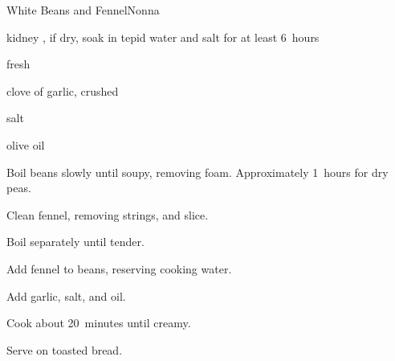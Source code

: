\begin{recipe}{White Beans and Fennel}{Nonna}{}

\begin{ingredients}
\item kidney , if dry, soak in tepid water and salt for at least 6~hours
\item fresh 
\item clove of garlic, crushed
\item salt
\item olive oil
\end{ingredients}

\begin{directions}
\item Boil beans slowly until soupy, removing foam. Approximately 1\half~hours for dry peas.
\item Clean fennel, removing strings, and slice.
\item Boil separately until tender.
\item Add fennel to beans, reserving cooking water.
\item Add garlic, salt, and oil.
\item Cook about 20~minutes until creamy.
\item Serve on toasted bread.
\end{directions}

\end{recipe}
